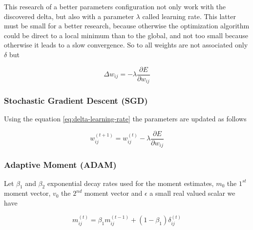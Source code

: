 \begin{figure}[!ht]
{
	}
     \label{fig:dummy}
   \end{figure}

This research of a better parameters configuration not only work with the discovered delta, but also with a parameter $\lambda$ called learning rate. This latter must be small for a better research, because otherwise the optimization algorithm could be direct to a local minimum than to the global, and not too small because otherwise it leads to a slow convergence. So to all weights are not associated only $\delta$ but 
\begin{center}
	\begin{equation}
		\Delta{w_{ij}} = -\lambda\frac{\partial{E}}{\partial{w_{ij}}}
	\end{equation}\label{eq:delta-learning-rate}
\end{center}

\subsubsection*{Stochastic Gradient Descent (SGD)}
Using the equation \ref{eq:delta-learning-rate} the parameters are updated as follows
\begin{center}
	\begin{equation}
		w_{ij}^{(t + 1)} = w_{ij}^{(t)} - \lambda\frac{\partial{E}}{\partial{w_{ij}}} 
	\end{equation}
\end{center}

\subsubsection*{Adaptive Moment (ADAM)}
Let $\beta_1$ and $\beta_2$ exponential decay rates used for the moment estimates, $m_0$ the $1^{st}$ moment vector, $v_0$ the $2^{nd}$ moment vector and $\epsilon$ a small real valued scalar we have 
\begin{center}
	\begin{equation}
		m_{ij}^{(t)} = \beta_1m_{ij}^{(t-1)} + (1 - \beta_1)\delta_{ij}^{(t)}
	\end{equation}
\end{center}

